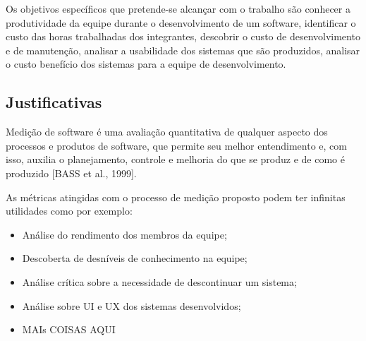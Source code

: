 	Os objetivos específicos que pretende-se alcançar com o trabalho são conhecer a produtividade da equipe durante o desenvolvimento de um software, identificar o custo das horas trabalhadas dos integrantes, descobrir o custo de desenvolvimento e de manutenção, analisar a usabilidade dos sistemas que são produzidos, analisar o custo benefício dos sistemas para a equipe de desenvolvimento.

\subsection{Justificativas}

	Medição de software é uma avaliação quantitativa de qualquer aspecto dos processos e produtos de software, que permite seu melhor entendimento e, com isso, auxilia o planejamento, controle e melhoria do que se produz e de como é produzido [BASS et al., 1999].

	As métricas atingidas com o processo de medição proposto podem ter infinitas utilidades como por exemplo:

	\begin{itemize}
		\item{Análise do rendimento dos membros da equipe;}
		\item{Descoberta de desníveis de conhecimento na equipe;}
		\item{Análise crítica sobre a necessidade de descontinuar um sistema;}
		\item{Análise sobre UI e UX dos sistemas desenvolvidos;}
		\item{MAIs COISAS AQUI}
	\end{itemize}
